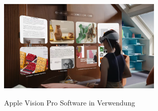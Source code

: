 \begin{figure}[ht!]
    \centering
    \includegraphics[width=0.7\textwidth]{attachments/Vision_2.png}
    \caption{Apple Vision Pro Software in Verwendung} \cite{Apple}
\end{figure}
